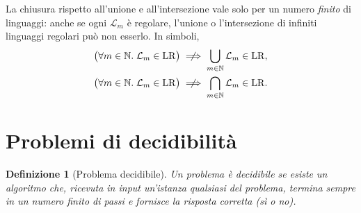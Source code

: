\documentclass[a4paper, 11pt, oneside]{book}
\theoremstyle{formale}
\newtheorem*{definition}{Definizione}
\begin{document}
    La chiusura rispetto all'unione e all'intersezione vale solo per un numero
    \emph{finito} di linguaggi: anche se ogni $\mathcal{L}_m$ \`e regolare, l'unione o
    l'intersezione di infiniti linguaggi regolari pu\`o non esserlo. In simboli,
    \begin{gather*}
        \bigl(\forall m \in \mathbb{N}.\; \mathcal{L}_m \in \mathrm{LR}\bigr)
        \centernot\implies \bigcup_{m \in \mathbb{N}} \mathcal{L}_m \in \mathrm{LR}, \\
        \bigl(\forall m \in \mathbb{N}.\; \mathcal{L}_m \in \mathrm{LR}\bigr)
        \centernot\implies \bigcap_{m \in \mathbb{N}} \mathcal{L}_m \in \mathrm{LR}.
    \end{gather*}

    \section{Problemi di decidibilit\`a}
    \begin{definition}[Problema decidibile]
        Un problema \`e \emph{decidibile} se esiste un algoritmo che, ricevuta in input
        un'istanza qualsiasi del problema, termina sempre in un numero finito di passi e
        fornisce la risposta corretta (s\`i o no).
    \end{definition}
\end{document}
